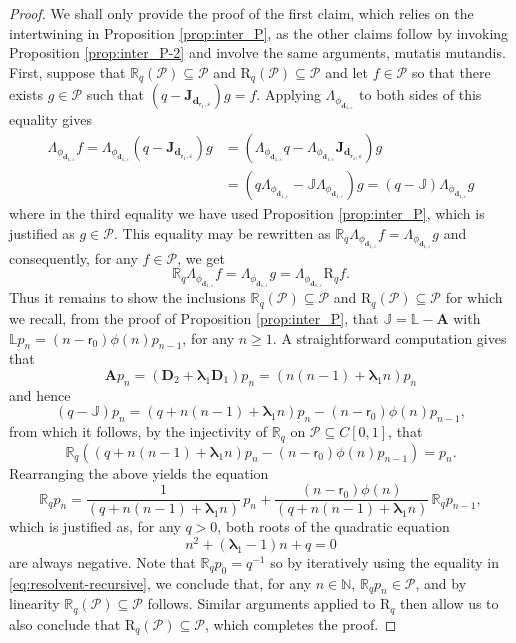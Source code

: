 \documentclass[JEP,XML,SOM,Unicode]{cedram}
\let\epsilon\varepsilon
\theoremstyle{plain}
\theoremstyle{definition}
\newcommand{\N}{\mathbb{N}}
\newcommand{\Poly}{\mathscr{P}}
\newcommand{\calL}{\mathds{L}}
\newcommand{\calJ}{\mathds{J}}
\newcommand{\calJd}{\mathbf{J}}
\newcommand{\dpt}{\bm{d}_{\vat,\epsilon}}
\newcommand{\dz}{{\bm{d}}_{1,\epsilon}}
\newcommand{\lam}{{\bm{\lambda}_1}}
\newcommand{\tet}{{\mathsf{r}_0}}
\newcommand{\vat}{{\mathsf{r}_1}}
\begin{document}
\begin{proof}
We shall only provide the proof of the first claim, which relies on the intertwining in Proposition \ref{prop:inter_P}, as the other claims follow by invoking Proposition \ref{prop:inter_P-2} and involve the same arguments, mutatis mutandis. First, suppose that $\mathds{R}_q(\Poly) \subseteq \Poly$ and $\mathrm{R}_q(\Poly) \subseteq \Poly$ and let $f \in \Poly$ so that there exists $g \in \Poly$ such that $(q-\calJd_{\dpt})g = f$. Applying $\Lambda_{\phi_{\dz}}$ to both sides of this equality gives
\begin{align*}
\Lambda_{\phi_{\dz}} f = \Lambda_{\phi_{\dz}}(q-\calJd_{\dpt})g &= (\Lambda_{\phi_{\dz}} q - \Lambda_{\phi_{\dz}}\calJd_{\dpt})g\\
&= (q\Lambda_{\phi_{\dz}} - \calJ \Lambda_{\phi_{\dz}})g = (q-\calJ)\Lambda_{\phi_{\dz}} g
\end{align*}
where in the third equality we have used Proposition \ref{prop:inter_P}, which is justified as $g \in \Poly$. This equality may be rewritten as $\mathds{R}_q \Lambda_{\phi_{\dz}} f = \Lambda_{\phi_{\dz}} g$ and consequently, for any $f \in \Poly$, we get
\begin{equation*}
\mathds{R}_q \Lambda_{\phi_{\dz}} f = \Lambda_{\phi_{\dz}} g = \Lambda_{\phi_{\dz}} \mathrm{R}_q f.
\end{equation*}
Thus it remains to show the inclusions $\mathds{R}_q(\Poly) \subseteq \Poly$ and $\mathrm{R}_q(\Poly) \subseteq \Poly$ for which we recall, from the proof of Proposition \ref{prop:inter_P}, that $\calJ = \calL-\mathbf{A}$ with $\calL p_n = (n-\tet)\phi(n)p_{n-1}$, for any $n \geq 1$. A straightforward computation gives that
\[
\mathbf{A} p_n = (\mathbf{D}_2 + \lam \mathbf{D}_1)p_n = (n(n-1)+\lam n)p_n
\]
and hence
\begin{equation*}
(q-\calJ)p_n = (q+n(n-1)+\lam n)p_n-(n-\tet)\phi(n)p_{n-1},
\end{equation*}
from which it follows, by the injectivity of $\mathds{R}_q$ on $\Poly \subseteq C[0,1]$, that
\begin{equation*}
\mathds{R}_q\left((q+n(n-1)+\lam n)p_n-(n-\tet)\phi(n)p_{n-1}\right) = p_n.
\end{equation*}
Rearranging the above yields the equation
\begin{equation}
\label{eq:resolvent-recursive}
\mathds{R}_q p_n = \frac{1}{(q+n(n-1)+\lam n)}\, p_n + \frac{(n-\tet)\phi(n)}{(q+n(n-1)+\lam n)}\, \mathds{R}_q p_{n-1},
\end{equation}
which is justified as, for any $q > 0$, both roots of the quadratic equation
\[
n^2+(\lam-1)n+q = 0
\]
are always negative. Note that $\mathds{R}_q p_0 = q^{-1}$ so by iteratively using the equality in \eqref{eq:resolvent-recursive}, we conclude that, for any $n\!\in\!\N$, $\mathds{R}_q p_n\!\in\!\Poly$, and by linearity $\mathds{R}_q(\Poly)\!\subseteq\!\Poly$ follows. Similar arguments applied to $\mathrm{R}_q$ then allow us to also conclude that $\mathrm{R}_q(\Poly) \subseteq \Poly$, which completes the proof.
\end{proof}
\end{document}
